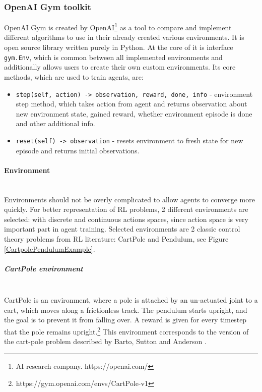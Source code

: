 \documentclass[12pt, a4paper]{article}
\begin{document}
\subsubsection{OpenAI Gym toolkit}

OpenAI Gym is created by OpenAI\footnote{AI research company. https://openai.com/} as a tool to compare and implement different algorithms to use in their already created various environments. It is open source library written purely in Python. At the core of it is interface \verb|gym.Env|, which is common between all implemented environments and additionally allows users to create their own custom environments. Its core methods, which are used to train agents, are:

\begin{itemize}
  \item \verb|step(self, action) -> observation, reward, done, info| - environment step method, which takes action from agent and returns observation about new environment state, gained reward, whether environment episode is done and other additional info. 
  \item \verb|reset(self) -> observation| - resets environment to fresh state for new episode and returns initial observations.
\end{itemize}

\paragraph{Environment}\mbox{}\\

Environments should not be overly complicated to allow agents to converge more quickly. For better representation of RL problems, 2 different environments are selected: with discrete and continuous actions spaces, since action space is very important part in agent training. Selected environments are 2 classic control theory problems from RL literature: CartPole and Pendulum, see Figure \ref{CartpolePendulumExample}.

\subparagraph{CartPole environment}\mbox{}\\

CartPole is an environment, where a pole is attached by an un-actuated joint to a cart, which moves along a frictionless track. The pendulum starts upright, and the goal is to prevent it from falling over. A reward is given for every timestep that the pole remains upright.\footnote{https://gym.openai.com/envs/CartPole-v1} This environment corresponds to the version of the cart-pole problem described by Barto, Sutton and Anderson \cite{6313077}.
\end{document}
